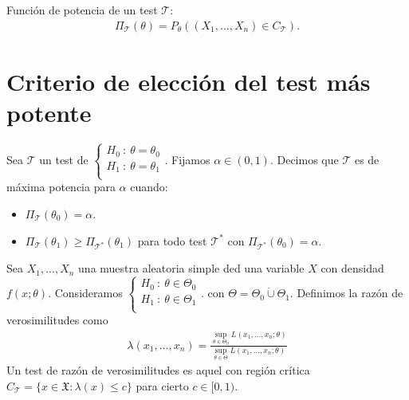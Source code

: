 \begin{defi}
Función de potencia de un test $\mathcal{T}$:
\begin{align*}
    \Pi_{\mathcal{T}}(\theta) = P_{\theta}((X_1,...,X_n) \in C_{\mathcal{T}}).
\end{align*}
\end{defi}

\section{Criterio de elección del test más potente}

\begin{defi}
Sea $\mathcal{T}$ un test de $
    \left\{ \begin{array}{lcc}
             H_0 \ : \ \theta = \theta_0\\
             H_1 \ : \ \theta = \theta_1 \\
             \end{array}
   \right.
$. Fijamos $\alpha \in (0,1)$. Decimos que $\mathcal{T}$ es de máxima potencia para $\alpha$ cuando:
\begin{itemize}
    \item $\Pi_{\mathcal{T}}(\theta_0) = \alpha$.
    \item $\Pi_{\mathcal{T}}(\theta_1) \ge \Pi_{\mathcal{T}^*}(\theta_1)$ para todo test $\mathcal{T}^*$ con $\Pi_{\mathcal{T}^*}(\theta_0) = \alpha$.
\end{itemize}
\end{defi}

\begin{defi}
Sea $X_1,...,X_n$ una muestra aleatoria simple ded una variable $X$ con densidad $f(x;\theta)$. Consideramos $
    \left\{ \begin{array}{lcc}
             H_0 \ : \ \theta \in \Theta_0\\
             H_1 \ : \ \theta \in \Theta_1 \\
             \end{array}
   \right.
$. con $\Theta = \Theta_0 \dot\cup \Theta_1$. Definimos la razón de verosimilitudes como
\begin{align*}
    \lambda(x_1,...,x_n) = \frac{\sup_{\theta \in \Theta_0} L(x_1,...,x_n;\theta)}{\sup_{\theta \in \Theta} L(x_1,...,x_n;\theta)}
\end{align*}
Un test de razón de  verosimilitudes es aquel con región crítica $C_{\mathcal{T}} = \{ x \in \mathfrak{X} : \lambda(x) \leq c \}$ para cierto $c \in [0,1)$.
\end{defi}

